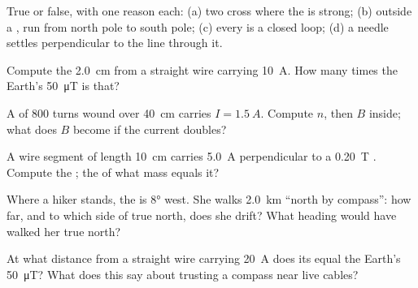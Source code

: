 \begin{exercise}[$\star$]\label{exo:g11:magnetic-fields:2}
True or false, with one reason each: (a) two 
cross where the  is strong; (b) outside a ,  run
from north pole to south pole; (c) every  is a
closed loop; (d) a needle settles perpendicular to the line through it.
\end{exercise}

\begin{exercise}[$\star$]\label{exo:g11:magnetic-fields:3}
Compute the  \qty{2.0}{cm} from a straight wire carrying
\qty{10}{A}. How many times the Earth's \qty{50}{\micro T} is that?
\end{exercise}

\begin{exercise}[$\star$]\label{exo:g11:magnetic-fields:4}
A  of $800$ turns wound over \qty{40}{cm} carries
$I = \qty{1.5}{A}$. Compute $n$, then $B$ inside; what does $B$ become
if the current doubles?
\end{exercise}

\begin{exercise}[$\star$]\label{exo:g11:magnetic-fields:5}
A wire segment of length \qty{10}{cm} carries \qty{5.0}{A}
perpendicular to a \qty{0.20}{T} . Compute the ; the
 of what mass equals it?
\end{exercise}

\begin{exercise}[$\star\star$]\label{exo:g11:magnetic-fields:6}
Where a hiker stands, the  is $\ang{8}$ west. She walks
\qty{2.0}{km} ``north by compass'': how far, and to which side of true
north, does she drift? What heading would have walked her true north?
\end{exercise}

\begin{exercise}[$\star\star$]\label{exo:g11:magnetic-fields:7}
At what distance from a straight wire carrying \qty{20}{A} does its
 equal the Earth's \qty{50}{\micro T}? What does this say about
trusting a compass near live cables?
\end{exercise}

